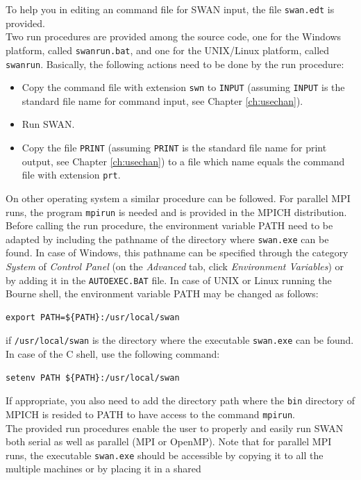 \documentclass[12pt]{book}
\begin{document}
To help you in editing an command file for SWAN input, the file {\tt swan.edt} is provided.
\\[2ex]
\noindent
Two run procedures are provided among the source code, one for the Windows platform, called
{\tt swanrun.bat}, and one for the UNIX/Linux platform, called {\tt swanrun}. Basically, the
following actions need to be done by the run procedure:
\begin{itemize}
  \item Copy the command file with extension {\tt swn} to {\tt INPUT} (assuming {\tt INPUT} is
        the standard file name for command input, see Chapter \ref{ch:usechan}).
  \item Run SWAN.
  \item Copy the file {\tt PRINT} (assuming {\tt PRINT} is the standard file name for print
        output, see Chapter \ref{ch:usechan}) to a file which name equals the command file
        with extension {\tt prt}.
\end{itemize}
On other operating system a similar procedure can be followed. For parallel MPI runs, the
program {\tt mpirun} is needed and is provided in the MPICH distribution.
\\[2ex]
\noindent
Before calling the run procedure, the environment variable PATH need to be adapted by
including the pathname of the directory where {\tt swan.exe} can be found. In case of Windows,
this pathname can be specified through the category {\it System} of {\it Control Panel} (on the
{\it Advanced} tab, click {\it Environment Variables}) or by adding it in the {\tt AUTOEXEC.BAT}
file. In case of UNIX or Linux running the Bourne shell, the environment variable PATH may be
changed as follows:
\begin{verbatim}
export PATH=${PATH}:/usr/local/swan
\end{verbatim}
if {\tt /usr/local/swan} is the directory where the executable {\tt swan.exe} can be found.
In case of the C shell, use the following command:
\begin{verbatim}
setenv PATH ${PATH}:/usr/local/swan
\end{verbatim}
If appropriate, you also need to add the directory path where the {\tt bin} directory of MPICH
is resided to PATH to have access to the command {\tt mpirun}.
\\[2ex]
\noindent
The provided run procedures enable the user to properly and easily run SWAN both serial as
well as parallel (MPI or OpenMP). Note that for parallel MPI runs, the executable {\tt swan.exe}
should be accessible by copying it to all the multiple machines or by placing it in a shared
\end{document}
